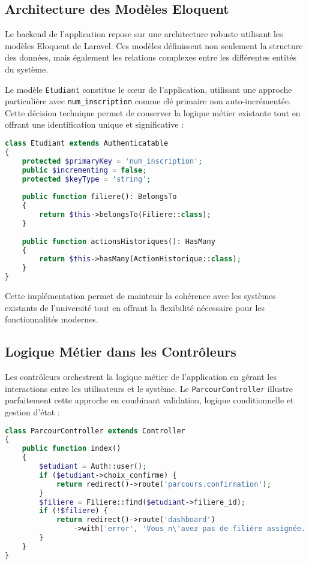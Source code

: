 \documentclass[12pt,a4paper]{report}
\begin{document}
\subsection{Architecture des Modèles Eloquent}

Le backend de l'application repose sur une architecture robuste utilisant les modèles Eloquent de Laravel. Ces modèles définissent non seulement la structure des données, mais également les relations complexes entre les différentes entités du système.

Le modèle \texttt{Etudiant} constitue le cœur de l'application, utilisant une approche particulière avec \texttt{num\_inscription} comme clé primaire non auto-incrémentée. Cette décision technique permet de conserver la logique métier existante tout en offrant une identification unique et significative :

\begin{lstlisting}[language=PHP]
class Etudiant extends Authenticatable
{
    protected $primaryKey = 'num_inscription';
    public $incrementing = false;
    protected $keyType = 'string';
    
    public function filiere(): BelongsTo
    {
        return $this->belongsTo(Filiere::class);
    }
    
    public function actionsHistoriques(): HasMany
    {
        return $this->hasMany(ActionHistorique::class);
    }
}
\end{lstlisting}

Cette implémentation permet de maintenir la cohérence avec les systèmes existants de l'université tout en offrant la flexibilité nécessaire pour les fonctionnalités modernes.

\subsection{Logique Métier dans les Contrôleurs}

Les contrôleurs orchestrent la logique métier de l'application en gérant les interactions entre les utilisateurs et le système. Le \texttt{ParcourController} illustre parfaitement cette approche en combinant validation, logique conditionnelle et gestion d'état :

\begin{lstlisting}[language=PHP]
class ParcourController extends Controller
{
    public function index()
    {
        $etudiant = Auth::user();
        if ($etudiant->choix_confirme) {
            return redirect()->route('parcours.confirmation');
        }
        $filiere = Filiere::find($etudiant->filiere_id);
        if (!$filiere) {
            return redirect()->route('dashboard')
                ->with('error', 'Vous n\'avez pas de filière assignée.');
        }
    }
}
\end{lstlisting}
\end{document}
